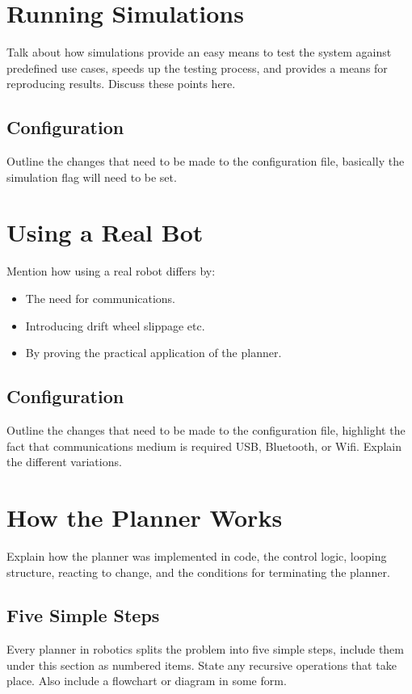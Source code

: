 \section{Running Simulations}
Talk about how simulations provide an easy means to test the system against predefined use cases, speeds up the testing process, and provides a means for reproducing results. Discuss these points here.

\subsection{Configuration}
Outline the changes that need to be made to the configuration file, basically the simulation flag will need to be set.


\section{Using a Real Bot}
Mention how using a real robot differs by:

\begin{itemize}
\item The need for communications.
\item Introducing drift wheel slippage etc.
\item By proving the practical application of the planner.
\end{itemize}

\subsection{Configuration}
Outline the changes that need to be made to the configuration file, highlight the fact that communications medium is required USB, Bluetooth, or Wifi. Explain the different variations.


\section{How the Planner Works}
Explain how the planner was implemented in code, the control logic, looping structure, reacting to change, and the conditions for terminating the planner.

\subsection{Five Simple Steps}
Every planner in robotics splits the problem into five simple steps, include them under this section as numbered items. State any recursive operations that take place. Also include a flowchart or diagram in some form.

